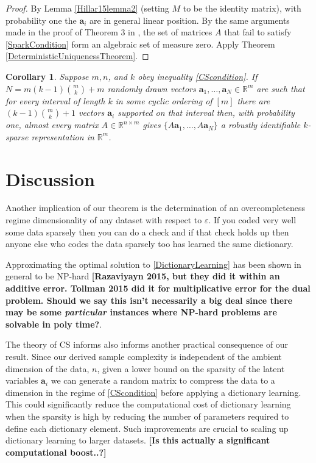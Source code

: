 \documentclass[journal, onecolumn]{IEEEtran}
\newtheorem{corollary}{Corollary}
\begin{document}
\begin{proof}
By Lemma \ref{Hillar15lemma2} (setting $M$ to be the identity matrix), with probability one the $\mathbf{a}_i$ are in general linear position. By the same arguments made in the proof of Theorem 3 in \cite{Hillar15}, the set of matrices $A$ that fail to satisfy \eqref{SparkCondition} form an algebraic set of measure zero. Apply Theorem \ref{DeterministicUniquenessTheorem}.
\end{proof}

\begin{corollary}
Suppose $m, n$, and $k$ obey inequality \eqref{CScondition}.  If $N = m(k-1){m \choose k}+m$ randomly drawn vectors $\mathbf{a}_1, \ldots, \mathbf{a}_N \in \mathbb{R}^m$ are such that for every interval of length $k$ in some cyclic ordering of $[m]$ there are $(k-1){m \choose k}+1$ vectors $\mathbf{a}_i$ supported on that interval then, with probability one, almost every matrix $A \in \mathbb{R}^{n \times m}$ gives $\{A\mathbf{a}_1, \ldots , A\mathbf{a}_N \}$ a robustly identifiable $k$-sparse representation in $\mathbb{R}^m$.
\end{corollary}



\section{Discussion}


Another implication of our theorem is the determination of an overcompleteness regime dimensionality of any dataset with respect to $\varepsilon$. If you coded very well some data sparsely then you can do a check and if that check holds up then anyone else who codes the data sparsely too has learned the same dictionary. 

Approximating the optimal solution to \eqref{DictionaryLearning} has been shown in general to be NP-hard \cite{Tillmann15, Razaviyayn} \textbf{[Razaviyayn 2015, but they did it within an additive error. Tollman 2015 did it for multiplicative error for the dual problem. Should we say this isn't necessarily a big deal since there may be some \emph{particular} instances where NP-hard problems are solvable in poly time?}. 

The theory of CS informs also informs another practical consequence of our result. Since our derived sample complexity is independent of the ambient dimension of the data, $n$, given a lower bound on the sparsity of the latent variables $\mathbf{a}_i$ we can generate a random matrix to compress the data to a dimension in the regime of \eqref{CScondition} before applying a dictionary learning. This could significantly reduce the computational cost of dictionary learning when the sparsity is high by reducing the number of parameters required to define each dictionary element. Such improvements are crucial to scaling up dictionary learning to larger datasets. \textbf{[Is this actually a significant computational boost..?]}
\end{document}
